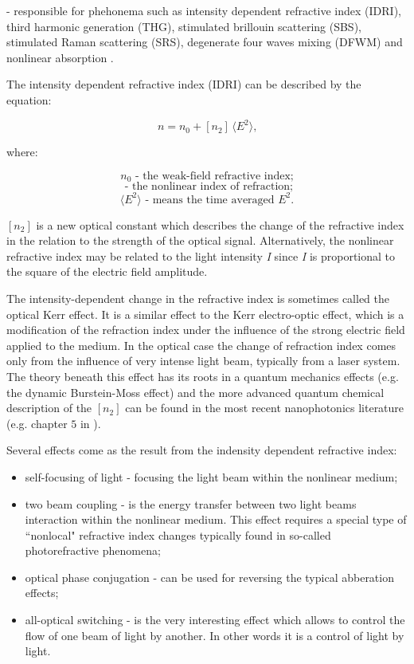\documentclass[12pt,twoside,a4paper]{article}
\numberwithin{equation}{subsection}
\numberwithin{figure}{subsection}
\begin{document}
- responsible for phehonema such as intensity dependent refractive index (IDRI), third harmonic generation (THG), stimulated
brillouin scattering (SBS), stimulated Raman scattering (SRS), degenerate four waves mixing (DFWM)
and nonlinear absorption \cite{samoc_nlo_opt_mat}. 

The intensity dependent refractive index (IDRI) can be described by the equation:

\begin{equation} \label{eq:refr_idri}
  n={n_{0}} + [{n_{2}}]\,\langle E^{2}\rangle \mbox{,}
\end{equation}

where: 

\begin{equation*}
  {n_{0}} \mbox{ - the weak-field refractive index;}
\end{equation*}
\begin{equation*}
  [{n_{2}}] \mbox{ - the nonlinear index of refraction;}
\end{equation*}
\begin{equation*}
  \langle E^{2}\rangle \mbox{ - means the time averaged $E^2$.}
\end{equation*}

$[n_2]$ is a new optical constant which describes the change of the refractive index in the relation to the strength of
the optical signal. Alternatively, the nonlinear refractive index may be related to the light intensity \textit{I} since \textit{I} is
proportional to the square of the electric field amplitude.

The intensity-dependent change in the refractive index is sometimes called the optical Kerr effect. It is a similar effect to
the Kerr electro-optic effect, which is a modification of the refraction index under the influence of the strong electric field
applied to the medium. In the optical case the change of refraction index comes only from the influence of very intense light beam,
typically from a laser system. The theory beneath this effect has its roots in a quantum mechanics effects (e.g. the dynamic
Burstein-Moss effect) and the more advanced quantum chemical description of the $[n_2]$ can be found in the most recent
nanophotonics literature (e.g. chapter $5$ in \cite{christodoulides_nonlinear}).

Several effects come as the result from the indensity dependent refractive index:
\begin{itemize}  
  \item self-focusing of light - focusing the light beam within the nonlinear medium;
  \item two beam coupling - is the energy transfer between two light beams interaction within the nonlinear medium. This effect
  requires a special type of ``nonlocal" refractive index changes typically found in so-called photorefractive phenomena;
  \item optical phase conjugation - can be used for reversing the typical abberation effects;
  \item all-optical switching - is the very interesting effect which allows to control the flow of one beam of light by another. In
  other words it is a control of light by light.
\end{itemize}
\end{document}
